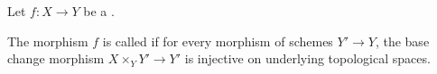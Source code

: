 \begin{definition} \label{definition:universally_injective_morphism_of_schemes}
    Let $f: X \to Y$ be a .

    The morphism $f$ is called  if for every morphism of schemes $Y' \to Y$, the base change morphism $X \times_Y Y' \to Y'$ is injective on underlying topological spaces.
\end{definition}
